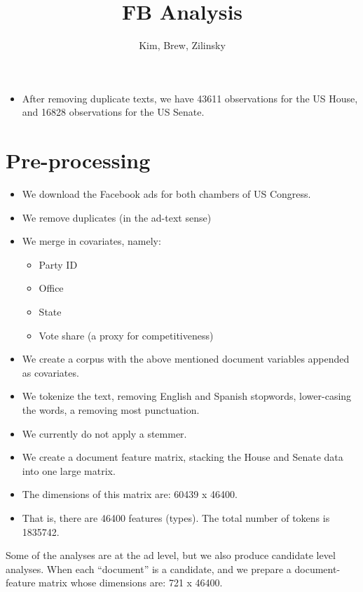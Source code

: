 \documentclass[
  12pt,
]{article}
\title{FB Analysis}
\author{Kim, Brew, Zilinsky}
\date{}
\providecommand{\tightlist}{%
  \setlength{\itemsep}{0pt}\setlength{\parskip}{0pt}}
\begin{document}
\maketitle

\begin{itemize}
\tightlist
\item
  After removing duplicate texts, we have 43611 observations for the US House, and 16828 observations for the US Senate.
\end{itemize}

\hypertarget{pre-processing}{%
\section{Pre-processing}\label{pre-processing}}

\begin{itemize}
\tightlist
\item
  We download the Facebook ads for both chambers of US Congress.
\item
  We remove duplicates (in the ad-text sense)
\item
  We merge in covariates, namely:

  \begin{itemize}
  \tightlist
  \item
    Party ID
  \item
    Office
  \item
    State
  \item
    Vote share (a proxy for competitiveness)
  \end{itemize}
\item
  We create a corpus with the above mentioned document variables appended as covariates.
\item
  We tokenize the text, removing English and Spanish stopwords, lower-casing the words, a removing most punctuation.
\item
  We currently do not apply a stemmer.
\item
  We create a document feature matrix, stacking the House and Senate data into one large matrix.
\item
  The dimensions of this matrix are: 60439 x 46400.
\item
  That is, there are 46400 features (types). The total number of tokens is 1835742.
\end{itemize}

Some of the analyses are at the ad level, but we also produce candidate level analyses. When each ``document'' is a candidate, and we prepare a document-feature matrix whose dimensions are: 721 x 46400.
\end{document}
